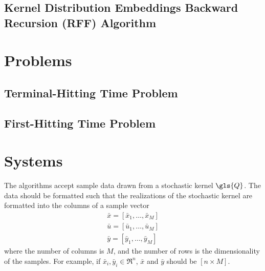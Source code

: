 \documentclass[11pt]{article}
\begin{document}
\subsection{Kernel Distribution Embeddings Backward Recursion (RFF) Algorithm}



\section{Problems}



\subsection{Terminal-Hitting Time Problem}



\subsection{First-Hitting Time Problem}



\section{Systems}

The algorithms accept sample data drawn from a stochastic kernel $\gls{Q}$. The data should be formatted such that the realizations of the stochastic kernel are formatted into the columns of a sample vector
\begin{align}
  \bar{x} = [\bar{x}_{1}, \ldots, \bar{x}_{M}] \\
  \bar{u} = [\bar{u}_{1}, \ldots, \bar{u}_{M}] \\
  \bar{y} = [\bar{y}_{1}, \ldots, \bar{y}_{M}]
\end{align}
where the number of columns is $M$, and the number of rows is the dimensionality of the samples. For example, if $\bar{x}_{i}, \bar{y}_{i} \in \Re^{n}$, $\bar{x}$ and $\bar{y}$ should be $[n \times M]$.

\end{document}
